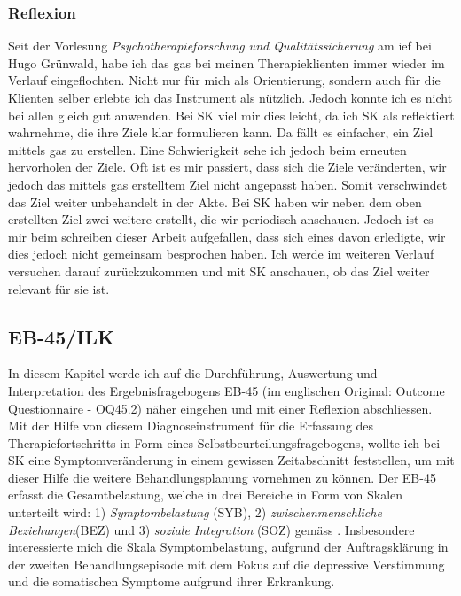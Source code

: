 \subsubsection{Reflexion}
Seit der Vorlesung \textit{Psychotherapieforschung und Qualitätssicherung} am \ac{ief} bei Hugo Grünwald, habe ich das \ac{gas} bei meinen Therapieklienten immer wieder im Verlauf eingeflochten. Nicht nur für mich als Orientierung, sondern auch für die Klienten selber erlebte ich das Instrument als nützlich. Jedoch konnte ich es nicht bei allen gleich gut anwenden. Bei SK viel mir dies leicht, da ich SK als reflektiert wahrnehme, die ihre Ziele klar formulieren kann. Da fällt es einfacher, ein Ziel mittels \ac{gas} zu erstellen. Eine Schwierigkeit sehe ich jedoch beim erneuten hervorholen der Ziele. Oft ist es mir passiert, dass sich die Ziele veränderten, wir jedoch das mittels \ac{gas} erstelltem Ziel nicht angepasst haben. Somit verschwindet das Ziel weiter unbehandelt in der Akte. Bei SK haben wir neben dem oben erstellten Ziel zwei weitere erstellt, die wir periodisch anschauen. Jedoch ist es mir beim schreiben dieser Arbeit aufgefallen, dass sich eines davon erledigte, wir dies jedoch nicht gemeinsam besprochen haben. Ich werde im weiteren Verlauf versuchen darauf zurückzukommen und mit SK anschauen, ob das Ziel weiter relevant für sie ist.

\subsection{EB-45/ILK}
In diesem Kapitel werde ich auf die Durchführung, Auswertung und Interpretation des Ergebnisfragebogens EB-45 (im englischen Original: Outcome Questionnaire - OQ45.2) näher eingehen  und mit einer Reflexion abschliessen. Mit der Hilfe von diesem Diagnoseinstrument für die Erfassung des Therapiefortschritts in Form eines Selbstbeurteilungsfragebogens, wollte ich bei SK eine Symptomveränderung in einem gewissen Zeitabschnitt feststellen, um mit dieser Hilfe die weitere Behandlungsplanung vornehmen zu können. Der EB-45 erfasst die Gesamtbelastung, welche in drei Bereiche in Form von Skalen unterteilt wird: 1) \textit{Symptombelastung} (SYB), 2) \textit{zwischenmenschliche Beziehungen}(BEZ) und 3) \textit{soziale Integration} (SOZ) gemäss . Insbesondere interessierte mich die Skala Symptombelastung, aufgrund der Auftragsklärung in der zweiten Behandlungsepisode mit dem Fokus auf die depressive Verstimmung und die somatischen Symptome aufgrund ihrer Erkrankung. 

